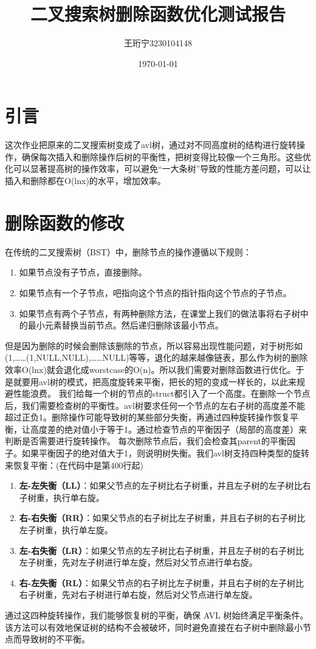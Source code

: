 \documentclass{article}
\title{二叉搜索树删除函数优化测试报告}
\author{王珩宁3230104148}
\date{\today}
\begin{document}
\maketitle

\section{引言}
这次作业把原来的二叉搜索树变成了avl树，通过对不同高度树的结构进行旋转操作，确保每次插入和删除操作后树的平衡性，把树变得比较像一个三角形。这些优化可以显著提高树的操作效率，可以避免“一大条树”导致的性能方差问题，可以让插入和删除都在O(lnx)的水平，增加效率。

\section{删除函数的修改}
在传统的二叉搜索树（BST）中，删除节点的操作遵循以下规则：
\begin{enumerate}
    \item 如果节点没有子节点，直接删除。
    \item 如果节点有一个子节点，吧指向这个节点的指针指向这个节点的子节点。
    \item 如果节点有两个子节点，有两种删除方法，在课堂上我们的做法事将右子树中的最小元素替换当前节点。然后递归删除该最小节点。
\end{enumerate}

但是因为删除的时候会删除该删除的节点，所以容易出现性能问题，对于树形如(1,……(1,NULL,NULL),……NULL)等等，退化的越来越像链表，那么作为树的删除效率O(lnx)就会退化成worstcase的O(n)。所以我们需要对删除函数进行优化。于是就要用avl树的模式，把高度旋转来平衡，把长的短的变成一样长的，以此来规避性能浪费。
我们给每一个树的节点的struct都引入了一个高度。在删除一个节点后，我们需要检查树的平衡性。avl树要求任何一个节点的左右子树的高度差不能超过正负1。删除操作可能导致树的某些部分失衡，再通过四种旋转操作恢复平衡，让高度差的绝对值小于等于1。通过检查节点的平衡因子（局部的高度差）来判断是否需要进行旋转操作。
每次删除节点后，我们会检查其parent的平衡因子。如果平衡因子的绝对值大于1，则说明树失衡。我们avl树支持四种类型的旋转来恢复平衡：(在代码中是第400行起)
\begin{enumerate}
    \item \textbf{左-左失衡（LL）}：如果父节点的左子树比右子树重，并且左子树的左子树比右子树重，执行单右旋。
    \item \textbf{右-右失衡（RR）}：如果父节点的右子树比左子树重，并且右子树的右子树比左子树重，执行单左旋。
    \item \textbf{左-右失衡（LR）}：如果父节点的左子树比右子树重，并且左子树的右子树比左子树重，先对左子树进行单左旋，然后对父节点进行单右旋。
    \item \textbf{右-左失衡（RL）}：如果父节点的右子树比左子树重，并且右子树的左子树比右子树重，先对右子树进行单右旋，然后对父节点进行单左旋。
\end{enumerate}

通过这四种旋转操作，我们能够恢复树的平衡，确保 AVL 树始终满足平衡条件。
该方法可以有效地保证树的结构不会被破坏，同时避免直接在右子树中删除最小节点而导致树的不平衡。
\end{document}
